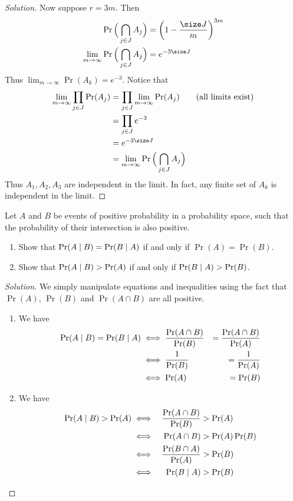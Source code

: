 \documentclass[12pt]{article}
\begin{document}
\begin{proof}[Solution]
    Now suppose $r = 3m$.
    Then \begin{align*}
        \Pr\Big(\bigcap_{j \in J} A_j\Big) &= \left(1 - \frac{\size J}{m}\right)^{3m} \\
        \lim_{m \to \infty} \Pr\Big(\bigcap_{j \in J} A_j\Big) &= e^{-3\size J}
    \end{align*}
    Thus $\lim_{m \to \infty} \Pr(A_k) = e^{-3}$.
    Notice that \begin{align*}
        \lim_{m \to \infty} \prod_{j \in J} \Pr(A_j) &= \prod_{j \in J} \lim_{m \to \infty} \Pr(A_j) \tag{all limits exist} \\
        &= \prod_{j \in J} e^{-3} \\
        &= e^{-3\size J} \\
        &= \lim_{m \to \infty} \Pr\Big(\bigcap_{j \in J} A_j\Big)
    \end{align*}
    Thus $A_1, A_2, A_3$ are independent in the limit.
    In fact, any finite set of $A_k$ is independent in the limit.
\end{proof}

\begin{problem}
    Let $A$ and $B$ be events of positive probability in a probability space,
    such that the probability of their intersection is also positive.
    \begin{enumerate}[label=(\arabic*)]
        \item Show that $\Pr(A \mid B) = \Pr(B \mid A)$ if and only if
            $\Pr(A) = \Pr(B)$.
        \item Show that $\Pr(A \mid B) > \Pr(A)$ if and only if
            $\Pr(B \mid A) > \Pr(B)$.
    \end{enumerate}
\end{problem}
\begin{proof}[Solution] \leavevmode
    We simply manipulate equations and inequalities using the fact that
    $\Pr(A)$, $\Pr(B)$ and $\Pr(A \cap B)$ are all positive.
    \begin{enumerate}[label=(\arabic*)]
        \item We have
            \begin{alignat*}{2}
                \Pr(A \mid B) = \Pr(B \mid A) &\iff \frac{\Pr(A \cap B)}{\Pr(B)} &= \frac{\Pr(A \cap B)}{\Pr(A)} \\
                &\iff \frac{1}{\Pr(B)} &= \frac{1}{\Pr(A)} \\
                &\iff \Pr(A) &= \Pr(B)
            \end{alignat*}
        \item We have
            \begin{alignat*}{2}
                \Pr(A \mid B) > \Pr(A) &\iff& \frac{\Pr(A \cap B)}{\Pr(B)} &> \Pr(A) \\
                &\iff& \Pr(A \cap B) &> \Pr(A) \Pr(B) \\
                &\iff& \frac{\Pr(B \cap A)}{\Pr(A)} &> \Pr(B) \\
                &\iff& \Pr(B \mid A) &> \Pr(B) \tag*{\qedhere}
            \end{alignat*}
    \end{enumerate}
\end{proof}
\end{document}
